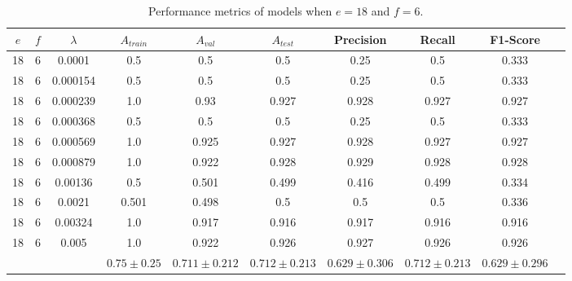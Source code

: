 \begin{table}[ht]
\centering
\begin{tabular}{ |c|c|c|c|c|c|c|c|c|c| }
\hline
$e$ & $f$ & $\lambda$ & $A_{train}$ & $A_{val}$ & $A_{test}$ & Precision & Recall & F1-Score \\
\hline
18 & 6 & 0.0001 & 0.5 & 0.5 & 0.5 & 0.25 & 0.5 & 0.333 \\
18 & 6 & 0.000154 & 0.5 & 0.5 & 0.5 & 0.25 & 0.5 & 0.333 \\
18 & 6 & 0.000239 & 1.0 & 0.93 & 0.927 & 0.928 & 0.927 & 0.927 \\
18 & 6 & 0.000368 & 0.5 & 0.5 & 0.5 & 0.25 & 0.5 & 0.333 \\
18 & 6 & 0.000569 & 1.0 & 0.925 & 0.927 & 0.928 & 0.927 & 0.927 \\
18 & 6 & 0.000879 & 1.0 & 0.922 & 0.928 & 0.929 & 0.928 & 0.928 \\
18 & 6 & 0.00136 & 0.5 & 0.501 & 0.499 & 0.416 & 0.499 & 0.334 \\
18 & 6 & 0.0021 & 0.501 & 0.498 & 0.5 & 0.5 & 0.5 & 0.336 \\
18 & 6 & 0.00324 & 1.0 & 0.917 & 0.916 & 0.917 & 0.916 & 0.916 \\
18 & 6 & 0.005 & 1.0 & 0.922 & 0.926 & 0.927 & 0.926 & 0.926 \\
\hline
 & & & $0.75\pm0.25$ & $0.711\pm0.212$ & $0.712\pm0.213$ & $0.629\pm0.306$ & $0.712\pm0.213$ & $0.629\pm0.296$ \\
\hline
\end{tabular}
\caption{Performance metrics of models when $e = 18$ and $f = 6$.}
\label{table:vgg16_finetuning_6}
\end{table}

